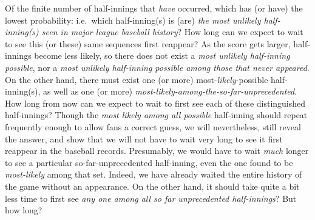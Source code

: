 Of the finite number of half-innings that \emph{have} occurred, which
has (or have) the lowest probability: i.e.~which half-inning(s) is
(are) \emph{the most unlikely half-inning(s) seen in major league
  baseball history}?
How long can we expect to wait to see this (or these) same sequences
first reappear?
As the score gets larger, half-innings become less likely, so there
does not exist a \emph{most unlikely half-inning possible}, nor a
\emph{most unlikely half-inning possible among those that never appeared}.
On the other hand, there must exist one (or more)
most-\emph{likely}-possible half-inning(s), as well as one (or more)
\emph{most-likely-among-the-so-far-unprecedented}.
How long from now can we expect to wait to first see each of these
distinguished half-innings?
Though the \emph{most likely among all possible} half-inning should repeat
frequently enough to allow fans a correct guess, we will nevertheless,
still reveal the answer, and show that we will not have to wait very
long to see it first reappear in the baseball records.  
Presumably, we would have to wait \emph{much} longer to see a particular
so-far-unprecedented half-inning, even the one found to be
\emph{most-likely} among that set.  
Indeed, we have already waited the entire history of the game without
an appearance.
On the other hand, it should take quite a bit less time to first see
\emph{any one among all so far unprecedented half-innings}?  
But how long?
